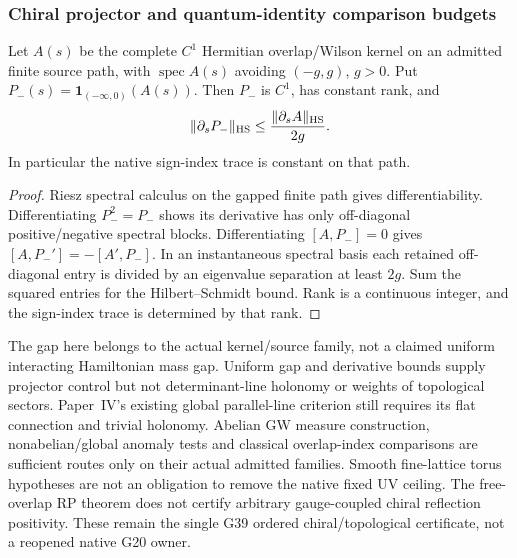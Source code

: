 \documentclass[12pt,a4paper]{article}
\begin{document}
\subsubsection{Chiral projector and quantum-identity comparison budgets}
\begin{proposition}
\label{p12:prop:v2210-lit-chiral-projector}
Let $A(s)$ be the complete $C^1$ Hermitian overlap/Wilson kernel on an
admitted finite source path, with $\operatorname{spec}A(s)$ avoiding
$(-g,g)$, $g>0$. Put $P_-(s)=\mathbf1_{(-\infty,0)}(A(s))$.
Then $P_-$ is $C^1$, has constant rank, and
\[
 \|\partial_sP_-\|_{\rm HS}\le\frac{\|\partial_sA\|_{\rm HS}}{2g}.
\]
In particular the native sign-index trace is constant on that path.
\end{proposition}
\begin{proof}
Riesz spectral calculus on the gapped finite path gives differentiability.
Differentiating $P_-^2=P_-$ shows its derivative has only off-diagonal
positive/negative spectral blocks. Differentiating $[A,P_-]=0$ gives
$[A,P_-']=-[A',P_-]$. In an instantaneous spectral basis each retained
off-diagonal entry is divided by an eigenvalue separation at least $2g$.
Sum the squared entries for the Hilbert--Schmidt bound. Rank is a continuous
integer, and the sign-index trace is determined by that rank.
\end{proof}
The gap here belongs to the actual kernel/source family, not a claimed
uniform interacting Hamiltonian mass gap. Uniform gap and derivative
bounds supply projector control but not determinant-line holonomy or
weights of topological sectors. Paper~IV's existing global parallel-line
criterion still requires its flat connection and trivial holonomy.
Abelian GW measure construction, nonabelian/global anomaly tests and
classical overlap-index comparisons
\cite{LitQFTLuscherAbelian1999,LitQFTLuscherNonabelian2000,
LitQFTBarCampos2000,LitQFTAdamsIndex2001} are sufficient routes only on
their actual admitted families. Smooth fine-lattice torus hypotheses are
not an obligation to remove the native fixed UV ceiling. The free-overlap
RP theorem \cite{LitQFTKikukawaUsui2010} does not certify arbitrary
gauge-coupled chiral reflection positivity. These remain the single G39
ordered chiral/topological certificate, not a reopened native G20 owner.
\end{document}
